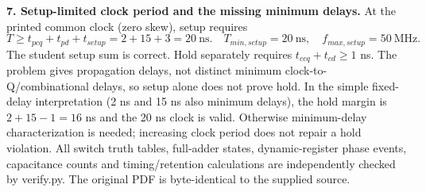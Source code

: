 \documentclass[10pt]{article}
\begin{document}
\textbf{7. Setup-limited clock period and the missing minimum delays.}
At the printed common clock (zero skew), setup requires
\[T\geq t_{pcq}+t_{pd}+t_{setup}=2+15+3=20\ \mathrm{ns}.
\quad\boxed{T_{min,setup}=20\ \mathrm{ns},\quad f_{max,setup}=50\ \mathrm{MHz}.}\]
The student setup sum is correct. Hold separately requires $t_{ccq}+t_{cd}\geq1$ ns. The problem gives propagation delays, not distinct minimum clock-to-Q/combinational delays, so setup alone does not prove hold. In the simple fixed-delay interpretation (2 ns and 15 ns also minimum delays), the hold margin is $2+15-1=16$ ns and the 20 ns clock is valid. Otherwise minimum-delay characterization is needed; increasing clock period does not repair a hold violation.
\small All switch truth tables, full-adder states, dynamic-register phase events, capacitance counts and timing/retention calculations are independently checked by verify.py. The original PDF is byte-identical to the supplied source.
\end{document}
